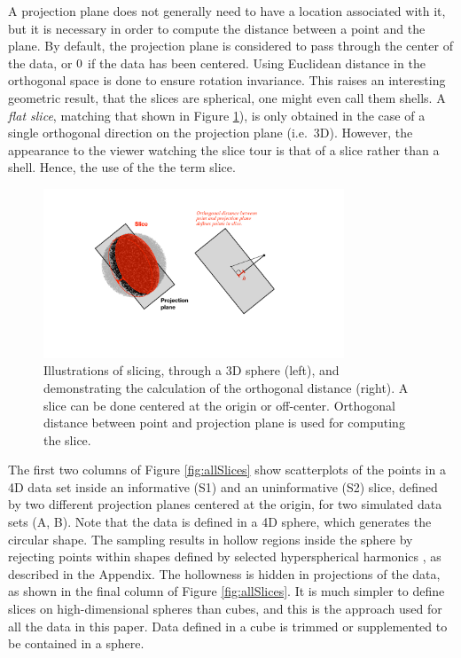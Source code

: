 \documentclass[]{interact}
\theoremstyle{plain}%
\theoremstyle{definition}
\theoremstyle{remark}
\begin{document}
A projection plane does not generally need to have a location associated
with it, but it is necessary in order to compute the distance between a
point and the plane. By default, the projection plane is considered to
pass through the center of the data, or \(\boldmath{0}\) if the data has
been centered. Using Euclidean distance in the orthogonal space is done
to ensure rotation invariance. This raises an interesting geometric
result, that the slices are spherical, one might even call them shells.
A \textit{flat slice}, matching that shown in Figure
\ref{fig:diagrams}), is only obtained in the case of a single orthogonal
direction on the projection plane (i.e.~3D). However, the appearance to
the viewer watching the slice tour is that of a slice rather than a
shell. Hence, the use of the the term slice.

\begin{figure}[ht]
\centerline{\includegraphics[width=0.8\textwidth]{diagrams/slice.pdf}}
\caption{Illustrations of slicing, through a 3D sphere (left), and demonstrating the calculation of the orthogonal distance (right). A slice can be done centered at the origin or off-center. Orthogonal distance between point and projection plane is used for computing the slice.}
\label{fig:diagrams}
\end{figure}

The first two columns of Figure \ref{fig:allSlices} show scatterplots of
the points in a 4D data set inside an informative (S1) and an
uninformative (S2) slice, defined by two different projection planes
centered at the origin, for two simulated data sets (A, B). Note that
the data is defined in a 4D sphere, which generates the circular shape.
The sampling results in hollow regions inside the sphere by rejecting
points within shapes defined by selected hyperspherical harmonics
\citep{doi:10.1063/1.3054274}, as described in the Appendix. The
hollowness is hidden in projections of the data, as shown in the final
column of Figure \ref{fig:allSlices}. It is much simpler to define
slices on high-dimensional spheres than cubes, and this is the approach
used for all the data in this paper. Data defined in a cube is trimmed
or supplemented to be contained in a sphere.
\end{document}
